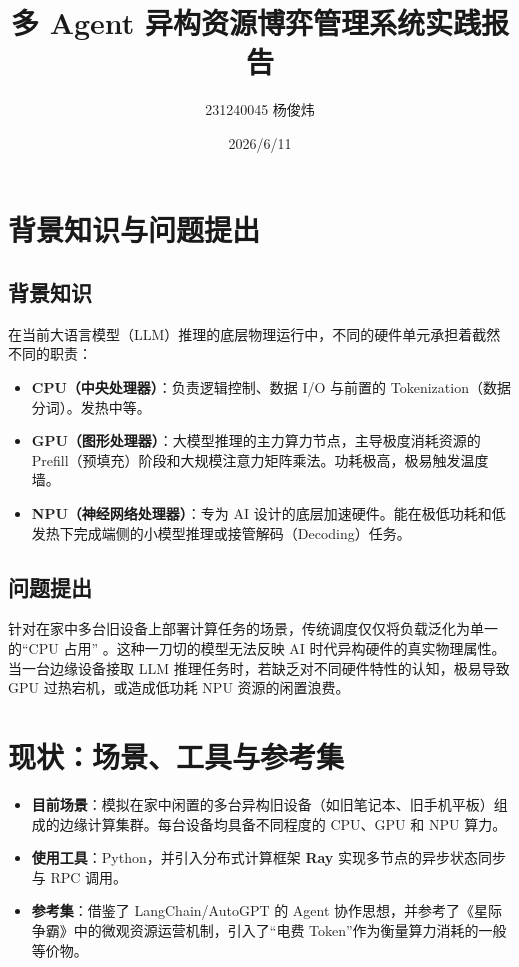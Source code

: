 \documentclass[11pt,a4paper]{ctexart}
\title{\vspace{-2cm}\textbf{多 Agent 异构资源博弈管理系统实践报告}}
\author{231240045 杨俊炜}
\date{2026/6/11}
\begin{document}
\maketitle
\vspace{-1.5cm}

\section{背景知识与问题提出}
\subsection{背景知识}
在当前大语言模型（LLM）推理的底层物理运行中，不同的硬件单元承担着截然不同的职责：
\begin{itemize}[leftmargin=*]
    \item \textbf{CPU（中央处理器）}：负责逻辑控制、数据 I/O 与前置的 Tokenization（数据分词）。发热中等。
    \item \textbf{GPU（图形处理器）}：大模型推理的主力算力节点，主导极度消耗资源的 Prefill（预填充）阶段和大规模注意力矩阵乘法。功耗极高，极易触发温度墙。
    \item \textbf{NPU（神经网络处理器）}：专为 AI 设计的底层加速硬件。能在极低功耗和低发热下完成端侧的小模型推理或接管解码（Decoding）任务。
\end{itemize}

\subsection{问题提出}
针对在家中多台旧设备上部署计算任务的场景，传统调度仅仅将负载泛化为单一的“CPU 占用” 。这种一刀切的模型无法反映 AI 时代异构硬件的真实物理属性。当一台边缘设备接取 LLM 推理任务时，若缺乏对不同硬件特性的认知，极易导致 GPU 过热宕机，或造成低功耗 NPU 资源的闲置浪费。

\section{现状：场景、工具与参考集}
\begin{itemize}[leftmargin=*]
    \item \textbf{目前场景}：模拟在家中闲置的多台异构旧设备（如旧笔记本、旧手机平板）组成的边缘计算集群。每台设备均具备不同程度的 CPU、GPU 和 NPU 算力。
    \item \textbf{使用工具}：Python，并引入分布式计算框架 \textbf{Ray}  实现多节点的异步状态同步与 RPC 调用。
    \item \textbf{参考集}：借鉴了 LangChain/AutoGPT 的 Agent 协作思想，并参考了《星际争霸》中的微观资源运营机制，引入了“电费 Token”作为衡量算力消耗的一般等价物。
\end{itemize}
\end{document}
